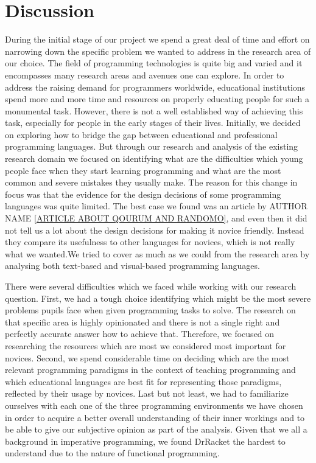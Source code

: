 \chapter{Discussion}
\label{chap:discussion}

During the initial stage of our project we spend a great deal of time and effort on narrowing down the specific problem we wanted to address in the research area of our choice. The field of programming technologies is quite big and varied and it encompasses many research areas and avenues one can explore. In order to address  the raising demand for programmers worldwide, educational institutions spend more and more time and resources on properly educating people for such a monumental task. However, there is not a well established way of achieving this task, especially for people in the early stages of their lives. Initially, we decided on exploring how to bridge the gap between educational and professional programming languages. But through our research and analysis of the existing research domain we  focused on identifying what are the difficulties which young people face when they start learning programming and what are the most common and severe mistakes they usually make. The reason for this change in focus was that the evidence for the design decisions of some programming languages was quite limited. The best case we found was an article by AUTHOR NAME \ref{ARTICLE ABOUT QOURUM AND RANDOMO}, and even then it did not tell us a lot about the design decisions for making it novice friendly. Instead they compare its usefulness to other languages for novices, which is not really what we wanted.We tried to cover as much as we could from the research area by analysing both text-based and visual-based programming languages. 

There were several difficulties which we faced while working with our research question. First, we had a tough choice identifying which might be the most severe problems pupils face when given programming tasks to solve. The research on that specific area is highly opinionated and there is not a single right and perfectly accurate answer how to achieve that. Therefore, we focused on researching the resources which are most we considered most important for novices. Second, we spend considerable time on deciding which are the most relevant programming paradigms in the context of teaching programming and which educational languages are best fit for representing those paradigms, reflected by their usage by novices. Last but not least, we had to familiarize ourselves with each one of the three programming environments we have chosen in order to acquire a better overall understanding of their inner workings and to be able to give our subjective opinion as part of the analysis. Given that we all a background in imperative programming, we found DrRacket the hardest to understand due to the nature of functional programming.

